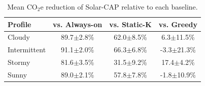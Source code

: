 \begin{table}[t]
\centering
\caption{Mean CO$_2$e reduction of Solar-CAP relative to each baseline.}
\label{tab:reductions}
\begin{tabular}{lccc}
\toprule
\textbf{Profile} & \textbf{vs. Always-on} & \textbf{vs. Static-K} & \textbf{vs. Greedy} \\
\midrule
Cloudy & 89.7$\pm$2.8\% & 62.0$\pm$8.5\% & 6.3$\pm$11.5\% \\
Intermittent & 91.1$\pm$2.0\% & 66.3$\pm$6.8\% & -3.3$\pm$21.3\% \\
Stormy & 81.6$\pm$3.5\% & 31.5$\pm$9.2\% & 17.4$\pm$4.2\% \\
Sunny & 89.0$\pm$2.1\% & 57.8$\pm$7.8\% & -1.8$\pm$10.9\% \\
\bottomrule
\end{tabular}
\end{table}